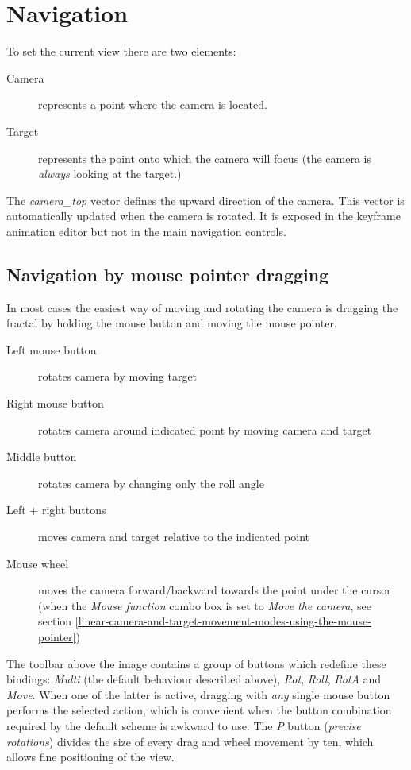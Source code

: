 \section{Navigation}\label{navigation}

To set the current view there are two elements:

\begin{description}
	\item[Camera] represents a point where the camera is located.
	\item[Target] represents the point onto which the camera will focus (the
	camera is \emph{always} looking at the target.)
\end{description}

The \emph{camera\_top} vector defines the upward direction of the camera. This vector is automatically updated when the camera is rotated. It is exposed in the keyframe animation editor but not in the main navigation controls.

\subsection{Navigation by mouse pointer dragging}\label{navigation-by-mouse-pointer-dragging} 

In most cases the easiest way of moving and rotating the camera is dragging the fractal by holding the mouse button and moving the mouse pointer.

\begin{description}
	\item[Left mouse button] rotates camera by moving target
	\item[Right mouse button] rotates camera around indicated point by moving camera and target
	\item[Middle button] rotates camera by changing only the roll angle
	\item[Left + right buttons] moves camera and target relative to the indicated point
	\item[Mouse wheel] moves the camera forward/backward towards the point under the cursor (when the \emph{Mouse function} combo box is set to \emph{Move the camera}, see section \ref{linear-camera-and-target-movement-modes-using-the-mouse-pointer})
\end{description}

The toolbar above the image contains a group of buttons which redefine these bindings: \emph{Multi} (the default behaviour described above), \emph{Rot}, \emph{Roll}, \emph{RotA} and \emph{Move}. When one of the latter is active, dragging with \emph{any} single mouse button performs the selected action, which is convenient when the button combination required by the default scheme is awkward to use. The \emph{P} button (\emph{precise rotations}) divides the size of every drag and wheel movement by ten, which allows fine positioning of the view.

